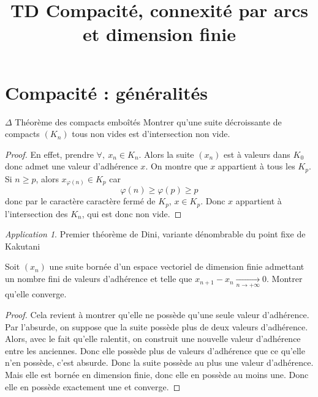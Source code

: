 \documentclass[french,a4paper]{article}
\title{TD Compacité, connexité par arcs et dimension finie}
\theoremstyle{plain}
\theoremstyle{definition}
\theoremstyle{remark}
\newtheorem*{app}{Application}
\begin{document}
\maketitle

\section{Compacité : généralités}

\begin{ex}{$\Delta$ Théorème des compacts emboîtés} Montrer qu'une suite décroissante de compacts $(K_n)$ tous non vides est d'intersection non vide.
\end{ex}
\begin{proof}
	En effet, prendre $\forall ,\ x_n\in K_n$. Alors la suite $(x_n)$ est à valeurs dans $K_0$ donc admet une valeur d'adhérence $x$. On montre que $x$ appartient à tous les $K_p$. Si $n\geqslant p$, alors $x_{\varphi(n)}\in K_p$ car $$\varphi(n)\geqslant\varphi(p)\geqslant p$$ donc par le caractère caractère fermé de $K_p$, $x\in K_p$. Donc $x$ appartient à l'intersection des $K_n$, qui est donc non vide.
\end{proof}
\begin{app}
	Premier théorème de Dini, variante dénombrable du point fixe de Kakutani
\end{app}

\begin{ex}{}
	Soit $(x_n)$ une suite bornée d'un espace vectoriel de dimension finie admettant un nombre fini de valeurs d'adhérence et telle que $x_{n+1}-x_n\xrightarrow[n\to+\infty]{}0$. Montrer qu'elle converge.
\end{ex}
\begin{proof}
	Cela revient à montrer qu'elle ne possède qu'une seule valeur d'adhérence. Par l'absurde, on suppose que la suite possède plus de deux valeurs d'adhérence. Alors, avec le fait qu'elle ralentit, on construit une nouvelle valeur d'adhérence entre les anciennes. Donc elle possède plus de valeurs d'adhérence que ce qu'elle n'en possède, c'est absurde. Donc la suite possède au plus une valeur d'adhérence. Mais elle est bornée en dimension finie, donc elle en possède au moins une. Donc elle en possède exactement une et converge.
\end{proof}
\end{document}
